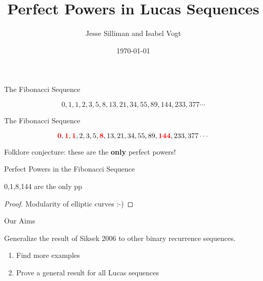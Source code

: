 \documentclass[pdf]{beamer}
\title{Perfect Powers in Lucas Sequences}
\author{Jesse Silliman and Isabel Vogt}
\date{\today}
\renewcommand{\emph}[1]{{\color{red}\textbf{#1}}}
\begin{document}
\begin{frame}
\thispagestyle{empty}         
\titlepage



\end{frame}
\addtocounter{framenumber}{-1} 

\begin{frame}{The Fibonacci Sequence}

\[0,1,1,2,3,5,8,13,21,34,55,89, 144,233, 377 \cdots \]


\end{frame}

\begin{frame}{The Fibonacci Sequence}

\[\emph{0},\emph{1},\emph{1},2,3,5,\emph{8},13,21,34,55,89,\emph{144},233, 377 \cdots \]

\pause

Folklore conjecture: these are the \emph{only} perfect powers!


\end{frame}





\begin{frame}{Perfect Powers in the Fibonacci Sequence}

\begin{theorem}
0,1,8,144 are the only pp
\end{theorem}

\pause

\begin{proof}
Modularity of elliptic curves :-)
\end{proof}


\end{frame}

\begin{frame}{Our Aims}

Generalize the result of Siksek 2006 to other binary recurrence sequences.

\begin{enumerate}[1.]

\item Find more examples

\item Prove a general result for all Lucas sequences

\end{enumerate}

\end{frame}
\end{document}

